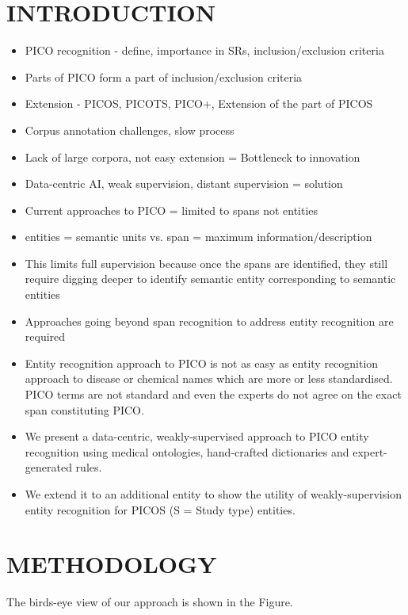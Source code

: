 \documentclass[10.7pt,]{article}
\begin{document}
\section{INTRODUCTION}\label{introduction}
%
\begin{itemize}
    \item PICO recognition - define, importance in SRs, inclusion/exclusion criteria
    \item Parts of PICO form a part of inclusion/exclusion criteria
    \item Extension - PICOS, PICOTS, PICO+, Extension of the part of PICOS
    \item Corpus annotation challenges, slow process
    \item Lack of large corpora, not easy extension = Bottleneck to innovation
    \item Data-centric AI, weak supervision, distant supervision = solution
    \item Current approaches to PICO = limited to spans not entities
    \item entities = semantic units vs. span = maximum information/description
    \item This limits full supervision because once the spans are identified, they still require digging deeper to identify semantic entity corresponding to semantic entities
    \item Approaches going beyond span recognition to address entity recognition are required
    \item Entity recognition approach to PICO is not as easy as entity recognition approach to disease or chemical names which are more or less standardised. PICO terms are not standard and even the experts do not agree on the exact span constituting PICO.
    \item We present a data-centric, weakly-supervised approach to PICO entity recognition using medical ontologies, hand-crafted dictionaries and expert-generated rules. 
    \item We extend it to an additional entity to show the utility of weakly-supervision entity recognition for PICOS (S = Study type) entities.
\end{itemize}
%
%
%
\section{METHODOLOGY}\label{methods}
%
The birds-eye view of our approach is shown in the Figure.
%
%
%
\end{document}

